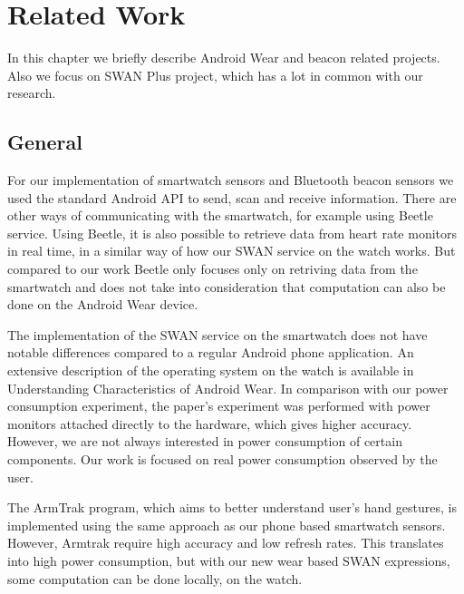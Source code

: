 
\chapter{Related Work} %

\label{Chapter2} %


In this chapter we briefly describe Android Wear and beacon related projects. Also we focus on SWAN Plus project, which has a lot in common with
our research.

\section{General}
For our implementation of smartwatch sensors and Bluetooth beacon sensors we used the standard Android API to send, scan and receive information.
There are other ways of communicating with the smartwatch, for example using Beetle\cite{beetle_mobisys16} service.
Using Beetle, it is also possible to retrieve data from heart rate monitors in real time, in a similar way of how our SWAN service on the watch works.
But compared to our work Beetle only focuses only on retriving data from the smartwatch and does not take into consideration that computation
can also be done on the Android Wear device.

The implementation of the SWAN service on the smartwatch does not have notable differences compared to a regular Android phone application.
An extensive description of the operating system on the watch is available  in Understanding Characteristics of Android Wear\cite{android_wear_char}.
In comparison with our power consumption experiment, the paper's experiment was performed  with power monitors attached 
directly to the hardware, which gives higher accuracy. However, we are not always interested in power consumption of certain components. Our work is focused on real
power consumption observed by the user.

The ArmTrak\cite{arm_trak} program, which aims to better understand user's hand gestures, is implemented using the same approach as our phone based 
smartwatch sensors.
However, Armtrak require high accuracy and low refresh rates. This translates into high power consumption, but with our new wear based SWAN expressions, some computation can be
done locally, on the watch.

